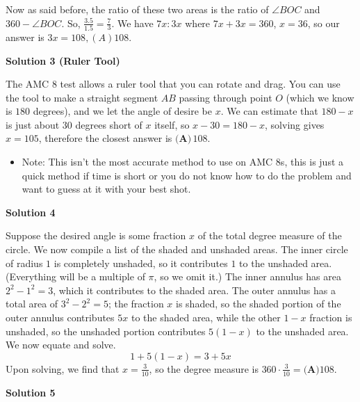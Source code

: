 \begin{enumerate}
 Now as said before, the ratio of these two areas is the ratio of $\angle{BOC}$ and $360 - \angle{BOC}$. So, $\frac{3.5}{1.5} = \frac{7}{3}$. We have $7x:3x$ where $7x+3x = 360$, $x = 36$, so our answer is $3x = 108, \boxed{(A) 108}$.

 



\textbf{Solution 3 (Ruler Tool)}

The AMC 8 test allows a ruler tool that you can rotate and drag. You can use the tool to make a straight segment $AB$ passing through point $O$ (which we know is $180$ degrees), and we let the angle of desire be $x$. We can estimate that $180-x$ is just about $30$ degrees short of $x$ itself, so $x-30=180-x$, solving gives $x=105$, therefore the closest answer is $\boxed{\textbf{(A)}\,108}$. 

 
            \begin{itemize}
        \item Note: This isn't the most accurate method to use on AMC 8s, this is just a quick method if time is short or you do not know how to do the problem and want to guess at it with your best shot.
            \end{itemize}
            



\textbf{Solution 4}

Suppose the desired angle is some fraction $x$ of the total degree measure of the circle. We now compile a list of the shaded and unshaded areas. The inner circle of radius $1$ is completely unshaded, so it contributes $1$ to the unshaded area. (Everything will be a multiple of $\pi$, so we omit it.) The inner annulus has area $2^2 - 1^2 = 3$, which it contributes to the shaded area. The outer annulus has a total area of $3^2 - 2^2 = 5$; the fraction $x$ is shaded, so the shaded portion of the outer annulus contributes $5x$ to the shaded area, while the other $1 - x$ fraction is unshaded, so the unshaded portion contributes $5(1-x)$ to the unshaded area. We now equate and solve. 
 \[1 + 5(1-x) = 3 + 5x\] Upon solving, we find that $x = \frac{3}{10}$, so the degree measure is $360 \cdot \frac{3}{10} = \boxed{\textbf{(A)} 108}$.

 



\textbf{Solution 5}


\end{enumerate}
